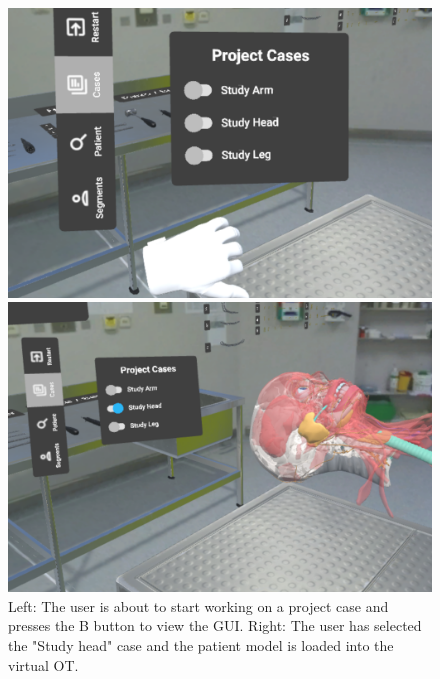 \begin{figure}[ht]
  \centering
  \begin{minipage}{.5\textwidth}
    \centering
    \includegraphics[width=0.99\linewidth]{images/implementation/user_interface/project_case_pre_load.png}
  \end{minipage}%
  \begin{minipage}{.5\textwidth}
    \centering
    \includegraphics[width=0.99\linewidth]{images/implementation/user_interface/project_case_loaded.png}
  \end{minipage}
  \caption{\label{fig::LoadingProjectCase} Left: The user is about to start working on a project case and presses the B button to view the GUI. Right: The user has selected the "Study head" case and the patient model is loaded into the virtual OT.}
\end{figure}

